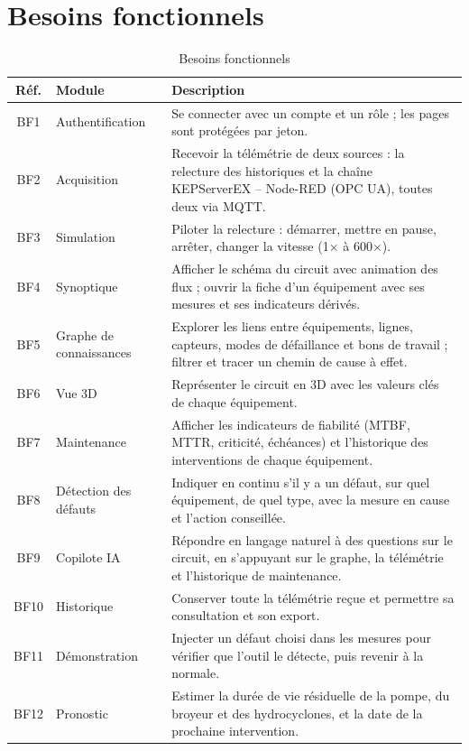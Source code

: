 \section{Besoins fonctionnels}
\begin{table}[H]
\centering
\caption{Besoins fonctionnels}
\label{tab:bf}
\begin{tabularx}{\textwidth}{c l X}
\toprule
\textbf{Réf.} & \textbf{Module} & \textbf{Description} \\
\midrule
BF1 & Authentification & Se connecter avec un compte et un rôle ; les pages sont protégées par jeton. \\
BF2 & Acquisition & Recevoir la télémétrie de deux sources : la relecture des historiques et la chaîne KEPServerEX -- Node-RED (OPC UA), toutes deux via MQTT. \\
BF3 & Simulation & Piloter la relecture : démarrer, mettre en pause, arrêter, changer la vitesse (1$\times$ à 600$\times$). \\
BF4 & Synoptique & Afficher le schéma du circuit avec animation des flux ; ouvrir la fiche d'un équipement avec ses mesures et ses indicateurs dérivés. \\
BF5 & Graphe de connaissances & Explorer les liens entre équipements, lignes, capteurs, modes de défaillance et bons de travail ; filtrer et tracer un chemin de cause à effet. \\
BF6 & Vue 3D & Représenter le circuit en 3D avec les valeurs clés de chaque équipement. \\
BF7 & Maintenance & Afficher les indicateurs de fiabilité (MTBF, MTTR, criticité, échéances) et l'historique des interventions de chaque équipement. \\
BF8 & Détection des défauts & Indiquer en continu s'il y a un défaut, sur quel équipement, de quel type, avec la mesure en cause et l'action conseillée. \\
BF9 & Copilote IA & Répondre en langage naturel à des questions sur le circuit, en s'appuyant sur le graphe, la télémétrie et l'historique de maintenance. \\
BF10 & Historique & Conserver toute la télémétrie reçue et permettre sa consultation et son export. \\
BF11 & Démonstration & Injecter un défaut choisi dans les mesures pour vérifier que l'outil le détecte, puis revenir à la normale. \\
BF12 & Pronostic & Estimer la durée de vie résiduelle de la pompe, du broyeur et des hydrocyclones, et la date de la prochaine intervention. \\
\bottomrule
\end{tabularx}
\end{table}

